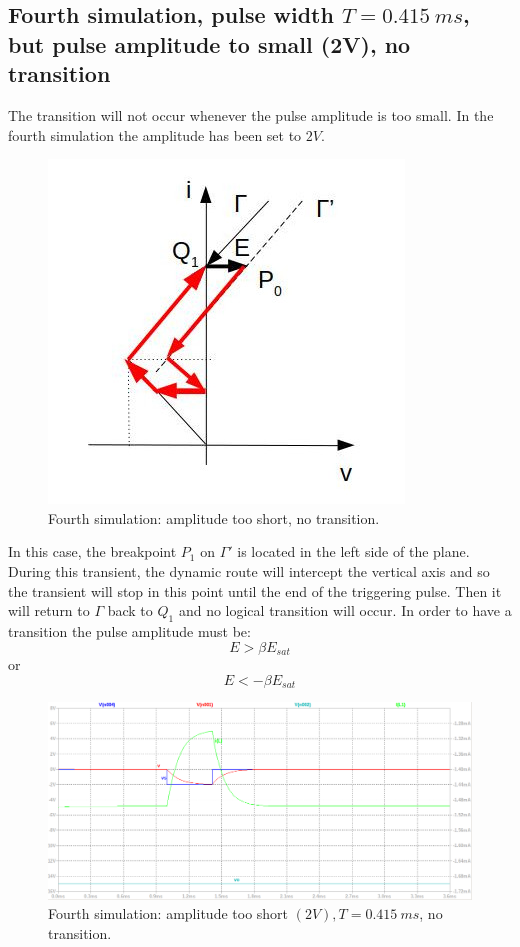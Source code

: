 \documentclass[letterpaper,11pt]{article}
\begin{document}
\subsection{Fourth simulation, pulse width $T=0.415\ ms$, but pulse amplitude to small (2V), no transition}
The transition will not occur whenever the pulse amplitude is too small. In the fourth simulation the amplitude has been set to $2V$.
%
\begin{figure}[!ht]
        \centering \includegraphics[width=0.6\columnwidth]{driving-point-characteristic-low-amplitude-shifted.jpg}
        \caption{\label{fourth-simulation-driving-point}Fourth simulation: amplitude too short, no transition.
        }
\end{figure}

\noindent In this case, the breakpoint $P_1$ on $\Gamma'$ is located in the left side of the plane. During this transient, the dynamic route will intercept the vertical axis and so the transient will stop in this point until the end of the triggering pulse. Then it will return to $\Gamma$ back to $Q_1$ and no logical transition will occur. In order to have a transition the pulse amplitude must be:
\begin{equation}
    E > \beta E_{sat}
\end{equation}
or
\begin{equation}
    E < -\beta E_{sat}
\end{equation}
\begin{figure}[!ht]
        \centering \includegraphics[width=0.8\columnwidth]{amplitude-short-no-transition.png}
        \caption{\label{fourth-simulation-amplitude-short}Fourth simulation: amplitude too short $(2V), T=0.415\ ms$, no transition.
        }
\end{figure}
%
\clearpage
\newpage
%
\end{document}
